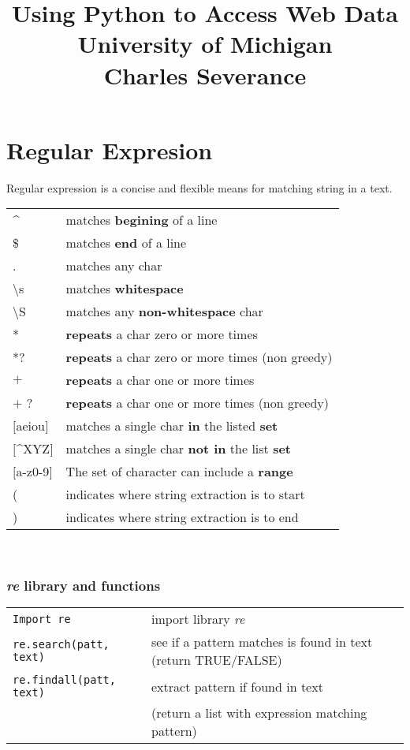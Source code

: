 \documentclass[a4paper,12pt]{report}
\newcommand{\code}[1]{\texttt{#1} }
\begin{document}
\tableofcontents

\title{Using Python to Access Web Data \\ University of Michigan \\ Charles Severance}
\maketitle
\part{Regular Expresion}
Regular expression is a concise and flexible means for matching string in a text.
\begin{table}[]
\centering
\label{}
\begin{tabular}{ll}
\^{}  & matches \textbf{begining} of a line   \\
 \$ &  matches \textbf{end} of a line  \\
 . &  matches any char \\
 \textbackslash s & matches \textbf{whitespace} \\
 \textbackslash S &  matches any \textbf{non-whitespace} char  \\
 * &   \textbf{repeats} a char zero or more times  \\
 *? &  \textbf{repeats} a char zero or more times (non greedy) \\
 $+$ & \textbf{repeats} a char one or more times \\ 
 $+$ ? & \textbf{repeats} a char one or more times (non greedy) \\ 
$[$aeiou$]$ & matches a single char \textbf{in} the listed \textbf{set}\\ 
$[$\^{}XYZ$]$ & matches a single char \textbf{not in} the list \textbf{set}\\ 
$[$a-z0-9$]$ & The set of character can include a \textbf{range} \\ 
( & indicates where string extraction is to start \\
) & indicates where string extraction is to end
\end{tabular}
\end{table}
\\

\section{\textit{re} library and functions}
\begin{table}[]
\centering
\label{}
\begin{tabular}{ll}
\code{Import re} &  import library \textit{re}   \\
 \code{re.search(patt, text)} &  see if a pattern matches is found in text (return TRUE/FALSE)  \\
 \code{re.findall(patt, text)} &  extract pattern if found in text \\
& (return a list with expression matching pattern)  \\
\end{tabular}
\end{table}
\end{document}

